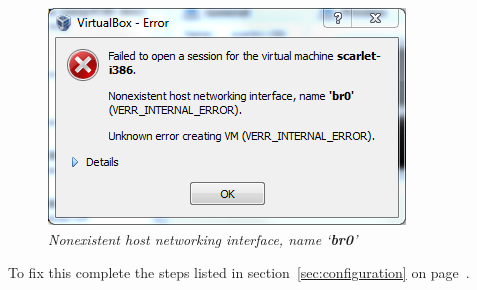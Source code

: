 \documentclass[pdftex,11pt,letterpaper]{article}
\begin{document}
    \begin{figure}[H]
        \begin{center}
        \leavevmode
            \includegraphics[]{scarlet_images/network_error.png}
        \end{center}
        \caption{\emph{Nonexistent host networking interface, name `\textbf{br0}'}}
        \label{fig:network_error}
    \end{figure}
    
To fix this complete the steps listed in section~\ref{sec:configuration} on page~\pageref{sec:configuration}.
\end{document}
